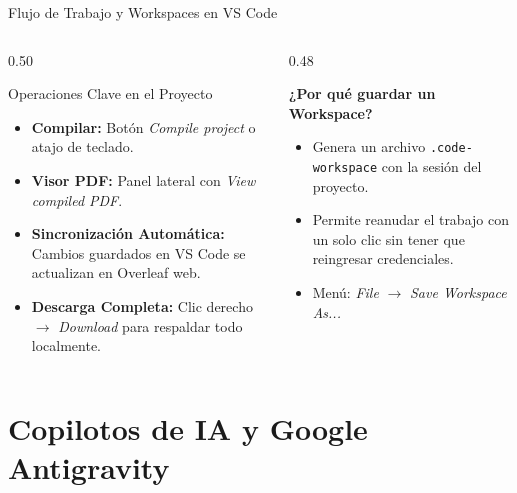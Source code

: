\documentclass[aspectratio=169, 10pt]{beamer}
\begin{document}
\begin{frame}{Flujo de Trabajo y Workspaces en VS Code}
  \begin{columns}[T]
    \begin{column}{0.50\textwidth}
      \begin{block}{Operaciones Clave en el Proyecto}
        \small
        \begin{itemize}
          \item \textbf{Compilar:} Botón \textit{Compile project} o atajo de teclado.
          \item \textbf{Visor PDF:} Panel lateral con \textit{View compiled PDF}.
          \item \textbf{Sincronización Automática:} Cambios guardados en VS Code se actualizan en Overleaf web.
          \item \textbf{Descarga Completa:} Clic derecho $\to$ \textit{Download} para respaldar todo localmente.
        \end{itemize}
      \end{block}
    \end{column}

    \begin{column}{0.48\textwidth}
      \begin{tcolorbox}[colback=pucpGray,colframe=pucpMidBlue,title=\textbf{Workspaces en VS Code},fonttitle=\bfseries\scriptsize,boxrule=0.6pt,top=1.5mm,bottom=1.5mm]
        \scriptsize
        \textbf{¿Por qué guardar un Workspace?}
        \begin{itemize}
          \item Genera un archivo \texttt{.code-workspace} con la sesión del proyecto.
          \item Permite reanudar el trabajo con un solo clic sin tener que reingresar credenciales.
          \item Menú: \textit{File} $\to$ \textit{Save Workspace As...}
        \end{itemize}
      \end{tcolorbox}
    \end{column}
  \end{columns}
\end{frame}

\section[Copilotos \& IA]{Copilotos de IA y Google Antigravity}
\end{document}
